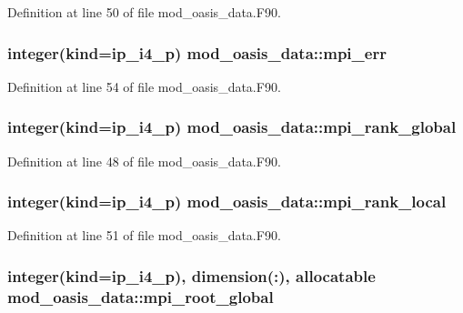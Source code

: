 Definition at line 50 of file mod\+\_\+oasis\+\_\+data.\+F90.

\hypertarget{classmod__oasis__data_abd48a08a17f07ec656912d9b2b7b7922}{
\subsubsection[{mpi\+\_\+err}]{\setlength{\rightskip}{0pt plus 5cm}integer(kind=ip\+\_\+i4\+\_\+p) mod\+\_\+oasis\+\_\+data\+::mpi\+\_\+err}}\label{classmod__oasis__data_abd48a08a17f07ec656912d9b2b7b7922}


Definition at line 54 of file mod\+\_\+oasis\+\_\+data.\+F90.

\hypertarget{classmod__oasis__data_af9bb2a4f321e7d7750e90c01022828fe}{
\subsubsection[{mpi\+\_\+rank\+\_\+global}]{\setlength{\rightskip}{0pt plus 5cm}integer(kind=ip\+\_\+i4\+\_\+p) mod\+\_\+oasis\+\_\+data\+::mpi\+\_\+rank\+\_\+global}}\label{classmod__oasis__data_af9bb2a4f321e7d7750e90c01022828fe}


Definition at line 48 of file mod\+\_\+oasis\+\_\+data.\+F90.

\hypertarget{classmod__oasis__data_a811747a1592795f860854f09f19d4c25}{
\subsubsection[{mpi\+\_\+rank\+\_\+local}]{\setlength{\rightskip}{0pt plus 5cm}integer(kind=ip\+\_\+i4\+\_\+p) mod\+\_\+oasis\+\_\+data\+::mpi\+\_\+rank\+\_\+local}}\label{classmod__oasis__data_a811747a1592795f860854f09f19d4c25}


Definition at line 51 of file mod\+\_\+oasis\+\_\+data.\+F90.

\hypertarget{classmod__oasis__data_a7f03d4afc0c91a42b13ddcf7ec082e51}{
\subsubsection[{mpi\+\_\+root\+\_\+global}]{\setlength{\rightskip}{0pt plus 5cm}integer(kind=ip\+\_\+i4\+\_\+p), dimension(\+:), allocatable mod\+\_\+oasis\+\_\+data\+::mpi\+\_\+root\+\_\+global}}\label{classmod__oasis__data_a7f03d4afc0c91a42b13ddcf7ec082e51}


